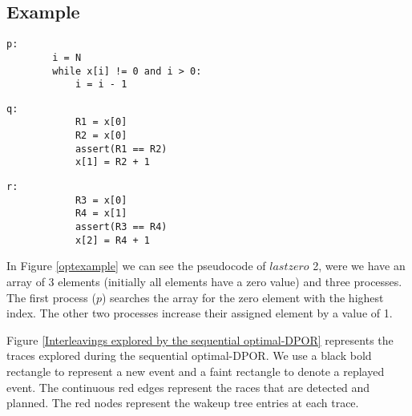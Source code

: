 \subsection{Example}

\begin{figure*}
    \begin{minipage}{0.3\textwidth}
      \begin{lstlisting}[frame=none, numbers=none]
        p:
        i = N
        while x[i] != 0 and i > 0:
            i = i - 1
      \end{lstlisting}
    \end{minipage}
    \begin{minipage}{0.3\textwidth}
        \begin{lstlisting}[frame=none, numbers=none]
            q:
            R1 = x[0]
            R2 = x[0]
            assert(R1 == R2)
            x[1] = R2 + 1
        \end{lstlisting}
      \end{minipage}
      \begin{minipage}{0.3\textwidth}
        \begin{lstlisting}[frame=none, numbers=none]
            r:
            R3 = x[0]
            R4 = x[1]
            assert(R3 == R4)
            x[2] = R4 + 1
        \end{lstlisting}
      \end{minipage}
      \caption{$Lastzero$ 2 example}
      \label{optexample}
  \end{figure*}

In Figure \ref{optexample} we can see the pseudocode of $lastzero$ 2, were we have an array of 3 elements (initially all elements have
a zero value) and three processes. The first process ($p$) searches the array for the zero element with the highest index. 
The other two processes increase their assigned element by a value of 1.


Figure \ref{Interleavings explored by the sequential optimal-DPOR} represents 
the traces explored during the sequential optimal-DPOR.
We use a black bold rectangle to represent a new event and a faint rectangle to denote a replayed event. 
The continuous red edges represent the races that are detected and planned. The red nodes represent the wakeup tree entries
at each trace.


